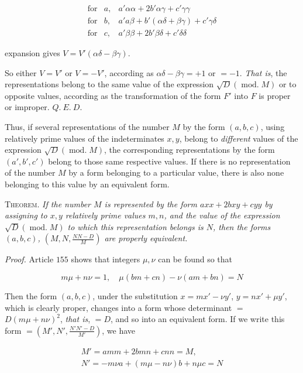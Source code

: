 \[
\begin{array}{lll}\text{for}&a,&a'\alpha\alpha+2b'\alpha\gamma+c'\gamma\gamma\\\text{for}&b,&a'a\beta+b'(\alpha\delta+\beta\gamma)+c'\gamma\delta\\\text{for}&c,&a'\beta\beta+2b'\beta\delta+c'\delta\delta\end{array}
\]

expansion gives $V=V'(\alpha\delta-\beta\gamma).$

So either $V=V'$ or $V=-V'$, according as $\alpha\delta-\beta\gamma=+1$ or $=-1$. \emph{That is}, the representations belong to the same value of the expression $\surd D(\operatorname{mod.}M)$ or to opposite values, according as the transformation of the form $F'$ into $F$ is proper or improper. $Q.\ E.\ D.$

Thus, if several representations of the number $M$ by the form $(a,b,c)$, using relatively prime values of the indeterminates $x,y$, belong to \emph{different} values of the expression $\surd D(\operatorname{mod.}M)$, the corresponding representations by the form $(a',b',c')$ belong to those same respective values. If there is no representation of the number $M$ by a form belonging to a particular value, there is also none belonging to this value by an equivalent form.



\textsc{Theorem.} \emph{If the number $M$ is represented by the form $axx+2bxy+cyy$ by assigning to $x,y$ relatively prime values $m,n$, and the value of the expression $\surd D(\operatorname{mod.}M)$ to which this representation belongs is $N$, then the forms $(a,b,c)$, $(M,N,\frac{NN-D}{M})$ are properly equivalent.}

\emph{Proof.} Article $155$ shows that integers $\mu,\nu$ can be found so that

\[
m\mu+n\nu=1,\quad \mu(bm+cn)-\nu(am+bn)=N
\]

Then the form $(a,b,c)$, under the substitution $x=mx'-\nu y'$, $y=nx'+\mu y'$, which is clearly proper, changes into a form whose determinant $=$ $D(m\mu+n\nu)^2$, \emph{that is}, $=D$, and so into an equivalent form. If we write this form $=(M',N',\frac{N'N'-D}{M'})$, we have

\[
\begin{gathered}M'=amm+2bmn+cnn=M,\\N'=-m\nu a+(m\mu-n\nu)b+n\mu c=N\end{gathered}
\]

